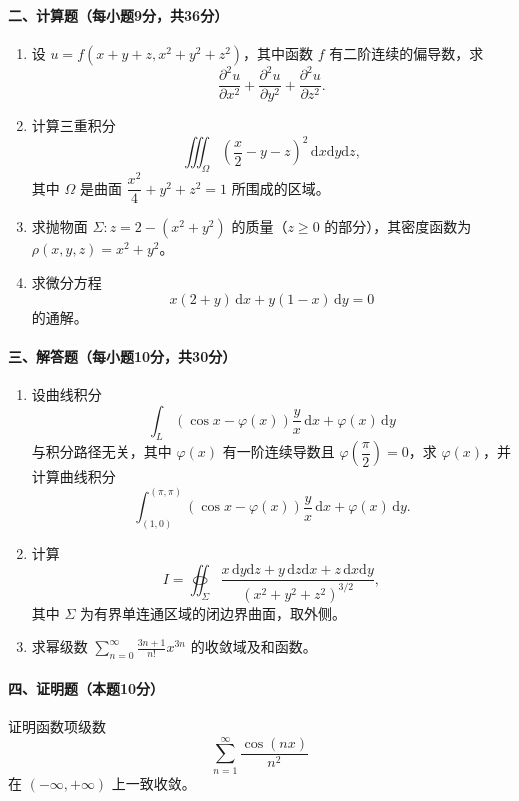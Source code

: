 \paragraph*{二、计算题（每小题9分，共36分）}
\begin{enumerate}
  \item 设 \(u=f(x+y+z,x^2+y^2+z^2)\)，其中函数 \(f\) 有二阶连续的偏导数，求
  \[
    \frac{\partial^2u}{\partial x^2}+
    \frac{\partial^2u}{\partial y^2}+
    \frac{\partial^2u}{\partial z^2}.
  \]

  \item 计算三重积分
  \[
    \iiint_\Omega\left(\frac x2-y-z\right)^2\,\mathrm{d}x\mathrm{d}y\mathrm{d}z,
  \]
  其中 \(\Omega\) 是曲面 \(\dfrac{x^2}{4}+y^2+z^2=1\) 所围成的区域。

  \item 求抛物面 \(\Sigma:z=2-(x^2+y^2)\) 的质量（\(z\ge0\) 的部分），其密度函数为
  \(\rho(x,y,z)=x^2+y^2\)。

  \item 求微分方程
  \[
    x(2+y)\,\mathrm{d}x+y(1-x)\,\mathrm{d}y=0
  \]
  的通解。
\end{enumerate}

\paragraph*{三、解答题（每小题10分，共30分）}
\begin{enumerate}
  \item 设曲线积分
  \[
    \int_L\left(\cos x-\varphi(x)\right)\frac yx\,\mathrm{d}x+\varphi(x)\,\mathrm{d}y
  \]
  与积分路径无关，其中 \(\varphi(x)\) 有一阶连续导数且
  \(\varphi\left(\dfrac{\pi}{2}\right)=0\)，求 \(\varphi(x)\)，并计算曲线积分
  \[
    \int_{(1,0)}^{(\pi,\pi)}
    \left(\cos x-\varphi(x)\right)\frac yx\,\mathrm{d}x+\varphi(x)\,\mathrm{d}y.
  \]

  \item 计算
  \[
    I=\oiint_\Sigma
    \frac{x\,\mathrm{d}y\mathrm{d}z+y\,\mathrm{d}z\mathrm{d}x+z\,\mathrm{d}x\mathrm{d}y}
    {(x^2+y^2+z^2)^{3/2}},
  \]
  其中 \(\Sigma\) 为有界单连通区域的闭边界曲面，取外侧。

  \item 求幂级数 \(\displaystyle \sum_{n=0}^{\infty}\frac{3n+1}{n!}x^{3n}\) 的收敛域及和函数。
\end{enumerate}

\paragraph*{四、证明题（本题10分）}
证明函数项级数
\[
  \sum_{n=1}^{\infty}\frac{\cos(nx)}{n^2}
\]
在 \((-\infty,+\infty)\) 上一致收敛。

